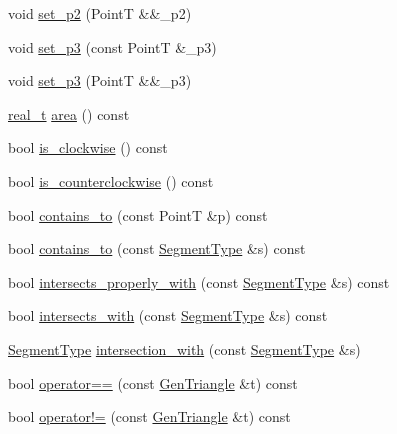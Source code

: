 \begin{DoxyCompactItemize}
\item 
void \hyperlink{class_designar_1_1_gen_triangle_afe141eabfa887a63fcdff0b084a1962e}{set\+\_\+p2} (PointT \&\&\+\_\+p2)
\item 
void \hyperlink{class_designar_1_1_gen_triangle_a2bb761ccf1029ca9118b9ae2fe924eab}{set\+\_\+p3} (const PointT \&\+\_\+p3)
\item 
void \hyperlink{class_designar_1_1_gen_triangle_ae5223087afc26fef8eea9f494fb2d770}{set\+\_\+p3} (PointT \&\&\+\_\+p3)
\item 
\hyperlink{namespace_designar_aca2c32af26808dbec1f3a3071fad25ce}{real\+\_\+t} \hyperlink{class_designar_1_1_gen_triangle_a620a2b19d9de408d4a7b303814dd7079}{area} () const
\item 
bool \hyperlink{class_designar_1_1_gen_triangle_a9a06ac565cc768c42fabd83048aa7d64}{is\+\_\+clockwise} () const
\item 
bool \hyperlink{class_designar_1_1_gen_triangle_a5539f60a36fb6b63e27b9fac8a9bd12f}{is\+\_\+counterclockwise} () const
\item 
bool \hyperlink{class_designar_1_1_gen_triangle_a5711c18dba2cb86351cd5cc4d6fb84de}{contains\+\_\+to} (const PointT \&p) const
\item 
bool \hyperlink{class_designar_1_1_gen_triangle_a5b9c54901803f0ed5ec895262e9434e0}{contains\+\_\+to} (const \hyperlink{class_designar_1_1_gen_triangle_a97d5ba127bcf8f120b1d408215956cee}{Segment\+Type} \&s) const
\item 
bool \hyperlink{class_designar_1_1_gen_triangle_ad5814f89889d33de29202c2527d78cd8}{intersects\+\_\+properly\+\_\+with} (const \hyperlink{class_designar_1_1_gen_triangle_a97d5ba127bcf8f120b1d408215956cee}{Segment\+Type} \&s) const
\item 
bool \hyperlink{class_designar_1_1_gen_triangle_a844330e0fb25541cf5fc07715013acb4}{intersects\+\_\+with} (const \hyperlink{class_designar_1_1_gen_triangle_a97d5ba127bcf8f120b1d408215956cee}{Segment\+Type} \&s) const
\item 
\hyperlink{class_designar_1_1_gen_triangle_a97d5ba127bcf8f120b1d408215956cee}{Segment\+Type} \hyperlink{class_designar_1_1_gen_triangle_af29ec91f9c69c5930e44e9bf2d9700f7}{intersection\+\_\+with} (const \hyperlink{class_designar_1_1_gen_triangle_a97d5ba127bcf8f120b1d408215956cee}{Segment\+Type} \&s)
\item 
bool \hyperlink{class_designar_1_1_gen_triangle_a37dfb2a595b866da16d8f8701af4859e}{operator==} (const \hyperlink{class_designar_1_1_gen_triangle}{Gen\+Triangle} \&t) const
\item 
bool \hyperlink{class_designar_1_1_gen_triangle_a7eb1324bfebed82ed90c793dac09d3a0}{operator!=} (const \hyperlink{class_designar_1_1_gen_triangle}{Gen\+Triangle} \&t) const
\end{DoxyCompactItemize}


